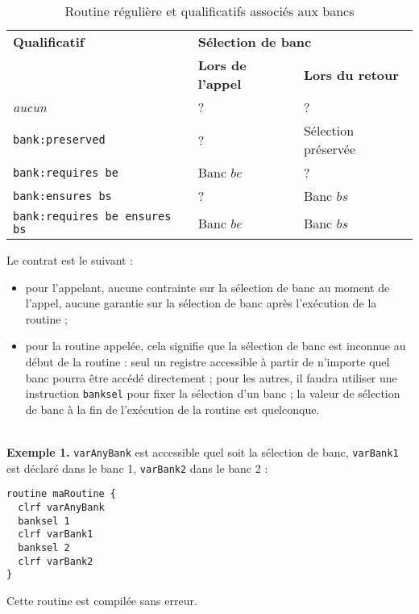 \begin{table}[!ht]
  \centering
  \begin{tabular}{lll}
    \textbf{Qualificatif} & \multicolumn{2}{l}{\bf Sélection de banc} \\
                          & \textbf{Lors de l'appel}  & \textbf{Lors du retour} \\
    \hline
    \emph{aucun} & ? & ?\\ 
    \texttt{bank:preserved} & ? & Sélection préservée\\ 
    \texttt{bank:requires be} & Banc $be$ & ?\\ 
    \texttt{bank:ensures bs} & ? & Banc $bs$\\ 
    \texttt{bank:requires be ensures bs} & Banc $be$ & Banc $bs$\\ 
    \hline
  \end{tabular}
  \caption{Routine régulière et qualificatifs associés aux bancs}
\end{table}


Le contrat est le suivant :
\begin{itemize}
\item pour l'appelant, aucune contrainte sur la sélection de banc au moment de l'appel, aucune garantie sur la sélection de banc après l'exécution de la routine ; 
\item pour la routine appelée, cela signifie que la sélection de banc est inconnue au début de la routine : seul un registre accessible à partir de n'importe quel banc pourra être accédé directement ; pour les autres, il faudra utiliser une instruction \texttt{banksel} pour fixer la sélection d'un banc ; la valeur de sélection de banc à la fin de l'exécution de la routine est quelconque.
\end{itemize}

~\\
\textbf{Exemple 1.} \texttt{varAnyBank} est accessible quel soit la sélection de banc, \texttt{varBank1} est déclaré dans le banc 1, \texttt{varBank2} dans le banc 2 :
\begin{lstlisting}[language=piccolo]
routine maRoutine {
  clrf varAnyBank
  banksel 1
  clrf varBank1
  banksel 2
  clrf varBank2
}
\end{lstlisting}

Cette routine est compilée sans erreur.


